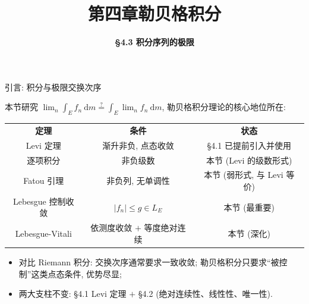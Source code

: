 


\title[第四章\\
勒贝格积分]{\texorpdfstring{\LARGE \bfseries 第四章\quad 勒贝格积分}{第四章 勒贝格积分}} %
\author[\S 4.3\\
积分序列的极限] %
{\Large \bfseries \S 4.3 积分序列的极限}
\date{}





\begin{frame}

\titlepage

\end{frame}




\begin{frame}{引言: 积分与极限交换次序}

本节研究 $\displaystyle \lim_n \int_E f_n ~ \mathrm{d} m \overset{?}{=} \int_E \lim_n f_n ~ \mathrm{d} m$,
勒贝格积分理论的\alert{核心地位}所在:

\begin{center}
\begin{tabular}{ccc}
\textbf{定理} & \textbf{条件} & \textbf{状态} \\[0.2em]
Levi 定理 & 渐升非负, 点态收敛 & \S 4.1 已提前引入并使用 \\
逐项积分 & 非负级数 & 本节 (Levi 的级数形式) \\
Fatou 引理 & 非负列, 无单调性 & 本节 (弱形式, 与 Levi 等价) \\
\alert{Lebesgue 控制收敛} & $|f_n| \leqslant g \in L_E$ & 本节 (最重要) \\
Lebesgue-Vitali & 依测度收敛 $+$ 等度绝对连续 & 本节 (深化) \\
\end{tabular}
\end{center}

\pause

\begin{itemize}
\item 对比 Riemann 积分: 交换次序通常要求\alert{一致收敛};
  勒贝格积分只要求``被控制''这类点态条件, 优势尽显;
\item 两大支柱不变: \S 4.1 Levi 定理 $+$ \S 4.2 (绝对连续性、线性性、唯一性).
\end{itemize}

\end{frame}

